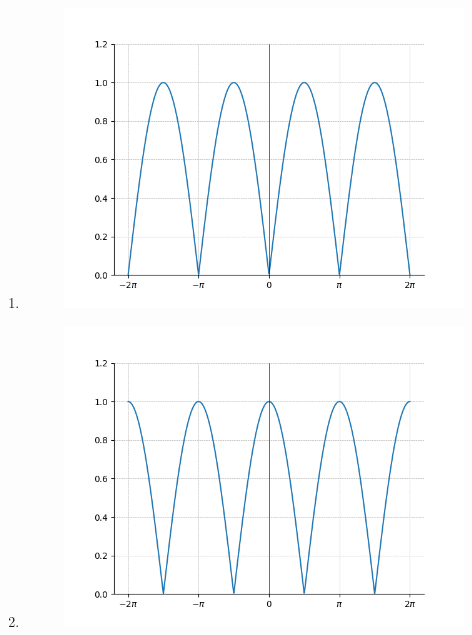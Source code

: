 \documentclass[journal]{IEEEtran}
\begin{document}
\begin{enumerate}
\begin{enumerate}
\begin{figure}[H]
                \caption{}
            \end{figure}
            \item 
            \begin{figure}[H]
                \centering
                \includegraphics[width = 1\linewidth]{figs/10c.png}
                \caption{}
            \end{figure}
            \item 
            \begin{figure}[H]
                \centering
                \includegraphics[width = 1\linewidth]{figs/10d.png}
                \caption{}
            \end{figure}
        \end{enumerate}


\end{enumerate}
\end{document}
